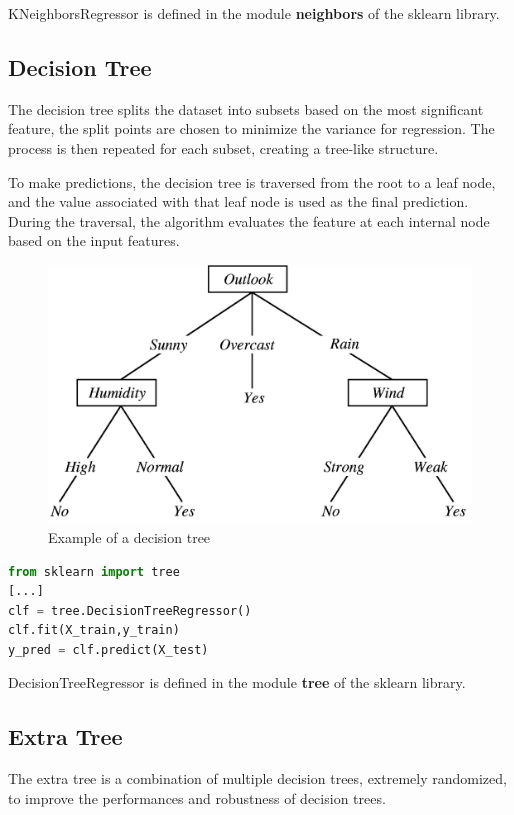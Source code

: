 KNeighborsRegressor is defined in the module \textbf{neighbors} of the sklearn library.

\subsection{Decision Tree}
The decision tree splits the dataset into subsets based on the most significant feature, the split points are chosen to minimize the variance for regression. The process is then repeated for each subset, creating a tree-like structure.

To make predictions, the decision tree is traversed from the root to a leaf node, and the value associated with that leaf node is used as the final prediction. During the traversal, the algorithm evaluates the feature at each internal node based on the input features.

\begin{figure}
    \centering
    \includegraphics[scale=0.3]{res/ML/decisiontree.png}
    \caption{Example of a decision tree}
\end{figure}

\begin{lstlisting}[language=Python, caption=Decision Tree implementation]
from sklearn import tree
[...]
clf = tree.DecisionTreeRegressor()
clf.fit(X_train,y_train)
y_pred = clf.predict(X_test)
\end{lstlisting}

DecisionTreeRegressor is defined in the module \textbf{tree} of the sklearn library.

\pagebreak

\subsection{Extra Tree}
The extra tree is a combination of multiple decision trees, extremely randomized, to improve the performances and robustness of decision trees.


